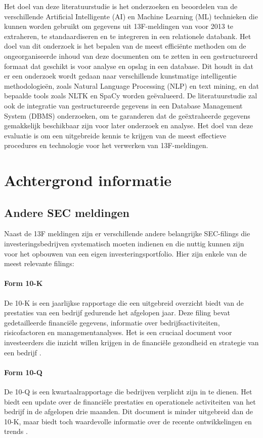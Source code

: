 Het doel van deze literatuurstudie is het onderzoeken en beoordelen van de verschillende Artificial Intelligente (AI) en Machine Learning (ML) technieken die kunnen worden gebruikt om gegevens uit 13F-meldingen van voor 2013 te extraheren, te standaardiseren en te integreren in een relationele databank. Het doel van dit onderzoek is het bepalen van de meest efficiënte methoden om de ongeorganiseerde inhoud van deze documenten om te zetten in een gestructureerd formaat dat geschikt is voor analyse en opslag in een database. Dit houdt in dat er een onderzoek wordt gedaan naar verschillende kunstmatige intelligentie methodologieën, zoals Natural Language Processing (NLP) en text mining, en dat bepaalde tools zoals NLTK en SpaCy worden geëvalueerd. De literatuurstudie zal ook de integratie van gestructureerde gegevens in een Database Management System (DBMS) onderzoeken, om te garanderen dat de geëxtraheerde gegevens gemakkelijk beschikbaar zijn voor later onderzoek en analyse. Het doel van deze evaluatie is om een uitgebreide kennis te krijgen van de meest effectieve procedures en technologie voor het verwerken van 13F-meldingen. 
\section{Achtergrond informatie}

\subsection{Andere SEC meldingen}
Naast de 13F meldingen zijn er verschillende andere belangrijke SEC-filings die investeringsbedrijven systematisch moeten indienen en die nuttig kunnen zijn voor het opbouwen van een eigen investeringsportfolio. Hier zijn enkele van de meest relevante filings:

\paragraph{Form 10-K}
De 10-K is een jaarlijkse rapportage die een uitgebreid overzicht biedt van de prestaties van een bedrijf gedurende het afgelopen jaar. Deze filing bevat gedetailleerde financiële gegevens, informatie over bedrijfsactiviteiten, risicofactoren en managementanalyses. Het is een cruciaal document voor investeerders die inzicht willen krijgen in de financiële gezondheid en strategie van een bedrijf \autocite{SECfiling2024} .

\paragraph{Form 10-Q}
De 10-Q is een kwartaalrapportage die bedrijven verplicht zijn in te dienen. Het biedt een update over de financiële prestaties en operationele activiteiten van het bedrijf in de afgelopen drie maanden. Dit document is minder uitgebreid dan de 10-K, maar biedt toch waardevolle informatie over de recente ontwikkelingen en trends  \autocite{SECfiling2024} \autocite{Baker2022}.

